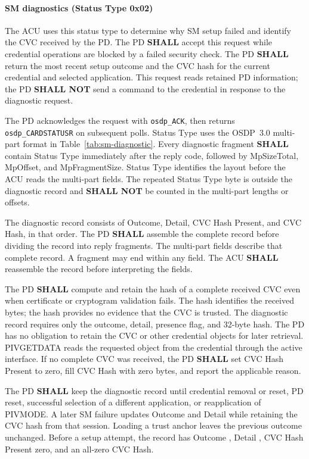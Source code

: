 \paragraph{SM diagnostics (Status Type 0x02)}
\label{sec:sm-diagnostics}
The ACU uses this status type to determine why SM setup failed and identify
the CVC received by the PD. The PD \textbf{SHALL} accept this request
while credential operations are blocked by a failed security check. The PD
\textbf{SHALL} return the most recent setup outcome and the CVC hash for
the current credential and selected application. This request reads retained
PD information; the PD \textbf{SHALL NOT} send a command to the credential
in response to the diagnostic request.

The PD acknowledges the request with \texttt{osdp\_ACK}, then returns
\texttt{osdp\_CARDSTATUSR} on subsequent polls. Status Type  uses
the OSDP~3.0 multi-part format in Table~\ref{tab:sm-diagnostic}.
Every diagnostic fragment \textbf{SHALL} contain Status Type 
immediately after the reply code, followed by MpSizeTotal, MpOffset, and
MpFragmentSize. Status Type identifies the layout before the ACU reads the
multi-part fields. The repeated Status Type byte is outside the diagnostic
record and \textbf{SHALL NOT} be counted in the multi-part lengths or offsets.



The diagnostic record consists of Outcome, Detail, CVC Hash Present, and
CVC Hash, in that order. The PD \textbf{SHALL} assemble the complete record before
dividing the record into reply fragments. The multi-part fields describe
that complete record. A fragment may end within any field. The ACU
\textbf{SHALL} reassemble the record before interpreting the fields.

The PD \textbf{SHALL} compute and retain the hash of a complete received CVC
even when certificate or cryptogram validation fails. The hash identifies the
received bytes; the hash provides no evidence that the CVC is trusted.
The diagnostic record requires only the outcome, detail, presence flag, and
32-byte hash. The PD has no obligation to retain the CVC or other credential
objects for later retrieval. PIVGETDATA reads the requested object from the
credential through the active interface.
If no complete CVC was received, the PD \textbf{SHALL} set CVC Hash Present
to zero, fill CVC Hash with zero bytes, and report the applicable reason.

The PD \textbf{SHALL} keep the diagnostic record until credential removal or
reset, PD reset, successful selection of a different application, or reapplication of
PIVMODE. A later SM failure updates Outcome and Detail while
retaining the CVC hash from that session. Loading a trust anchor leaves the previous
outcome unchanged. Before a setup attempt, the record has Outcome ,
Detail , CVC Hash Present zero, and an all-zero CVC Hash.

